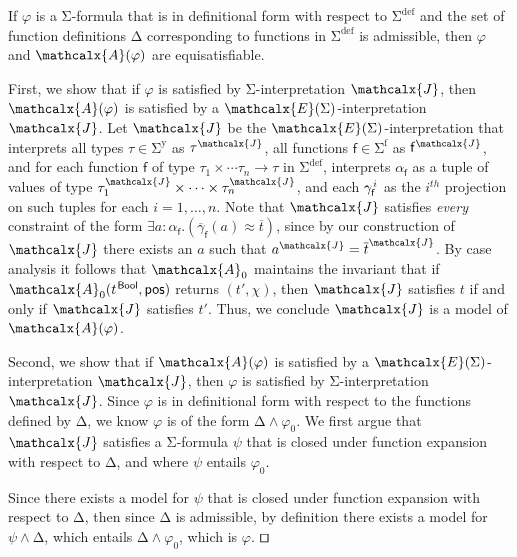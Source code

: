\documentclass[runningheads,a4paper]{llncs}
\newcommand\DDD{\Delta}
\newcommand{\con}[1]{\mathsf{#1}}
\renewcommand\vec[1]{\overline{#1}}
\let\oldSigma=\Sigma
\def\Sigma{\mathrm{\oldSigma}}
\let\oldDelta=\Delta
\def\Delta{\mathrm{\oldDelta}}
\let\oldwedge=\wedge
\def\wedge{\mathrel{\oldwedge}}
\newcommand{\teq}{\approx}
\newcommand{\I}{\mathcalx{J}} %
\newcommand{\J}{\mathcalx{J}}
\newcommand{\conv}{\mathcalx{A}}
\newcommand{\ssorts}[1]{#1^\mathrm{y}}
\newcommand{\sfuns}[1]{#1^\mathrm{f}}
\newcommand{\sfundefs}[1]{#1^\mathrm{def}}
\newcommand{\ppos}{\con{pos}}
\newcommand\ty[1]{\con{#1}}
\newcommand{\Bool}{\ty{Bool}}
\newcommand\concret{\gamma} %
\newcommand{\vecfarg}[1]{\vec{\concret}_{#1}}
\newcommand{\fargx}[2]{\concret^{\vthinspace#2}_{#1}}
\newcommand{\fargsort}[1]{\alpha_{#1}}
\newcommand{\extendsig}[1]{\mathcalx{E}( #1 )}
\newcommand{\vthinspace}{\kern+0.083333em}
\newcommand{\typ}[1]{^{\vthinspace #1}}
\renewcommand\qed{{\hfill$\squareforqed$}}
\begin{document}
\begin{theorem}\label{thm:equi}
If $\varphi$ is a\/ $\Sigma$-formula that is in definitional form with respect to\/
$\sfundefs{\Sigma}$
and the set of function definitions\/ $\DDD$ corresponding to functions in
$\sfundefs{\Sigma}$ is admissible, then\/ $\varphi$ and\/ $\conv( \varphi )$ are
equisatisfiable.
\end{theorem}
\begin{proofsketch}
First, we show that if $\varphi$ is satisfied by $\Sigma$-interpretation $\I$, then $\conv( \varphi )$ is satisfied by a $\extendsig{\Sigma}$-interpretation $\J$.
Let $\J$ be the $\extendsig{\Sigma}$-interpretation that interprets all types $\tau \in \ssorts{\Sigma}$ as $\tau^\I$,
all functions $\con{f} \in \sfuns{\Sigma}$ as $\con{f}^\I$,
and for each function $\con{f}$ of type $\tau_1 \times \cdots \tau_n \rightarrow \tau$ in $\sfundefs{\Sigma}$,
interprets $\fargsort{\con{f}}$ as a tuple of values of type $\tau_1^\I \times \cdots \times \tau_n^\I$,
and each $\fargx{\con{f}}{i}$ as the $i^{th}$ projection on such tuples for each $i = 1, \ldots, n$.
Note that $\J$ satisfies \emph{every} constraint of the form $\exists a : {\fargsort{\con{f}}}. ( \vecfarg{\con{f}}( a ) \teq \vec t )$,
since by our construction of $\J$ there exists an $a$ such that $a^\J = \vec t^\J$.
By case analysis it follows that $\conv_0$ maintains the invariant that
if $\conv_0( t\typ{\Bool}, \ppos )$ returns $( {t'}, \chi )$,
then $\I$ satisfies $t$ if and only if $\J$ satisfies $t'$.
Thus, we conclude $\J$ is a model of $\conv( \varphi )$.

Second, we show that if $\conv( \varphi )$ is satisfied by a
$\extendsig{\Sigma}$-interpretation $\I$, then $\varphi$ is satisfied by
$\Sigma$-interpretation $\J$. Since $\varphi$ is in definitional form with
respect to the functions defined by $\DDD$, we know $\varphi$ is of the form
$\DDD \wedge \varphi_0$. We first argue that $\I$ satisfies a $\Sigma$-formula
$\psi$ that is closed under function expansion with respect to $\DDD$, and
where $\psi$ entails $\varphi_0$.

Since there exists a model for $\psi$ that is closed under function expansion
with respect to $\DDD$, then since $\DDD$ is admissible, by definition there
exists a model for $\psi \wedge \DDD$, which entails $\DDD \wedge \varphi_0$,
which is $\varphi$.
\qed
\end{proofsketch}
\end{document}
